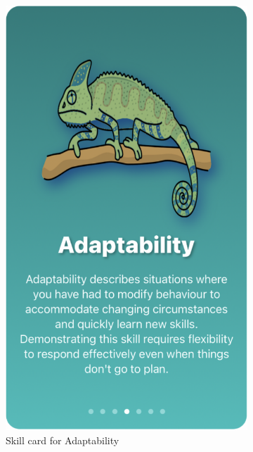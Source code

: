 \documentclass{l4proj}
\begin{document}
\begin{appendices}
\begin{figure}[H]
\begin{subfigure}[b]{0.3\textwidth}
        \includegraphics[scale=0.2]{images/AdaptabilityCard.pdf}
        \caption{Skill card for Adaptability}
        \label{fig:AdaptabilityCard}
    \end{subfigure}
    \begin{subfigure}[b]{0.3\textwidth}

\end{subfigure}
\end{figure}
\end{appendices}
\end{document}
